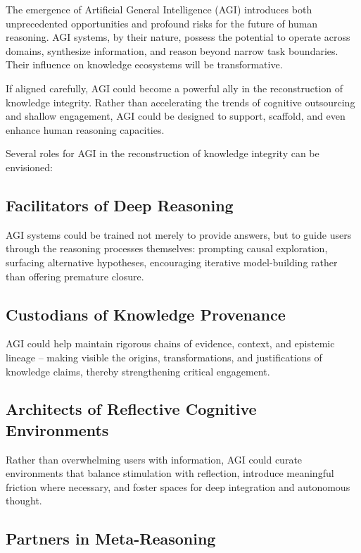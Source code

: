 The emergence of Artificial General Intelligence (AGI) introduces both
unprecedented opportunities and profound risks for the future of human
reasoning. AGI systems, by their nature, possess the potential to
operate across domains, synthesize information, and reason beyond narrow
task boundaries. Their influence on knowledge ecosystems will be
transformative.

If aligned carefully, AGI could become a powerful ally in the
reconstruction of knowledge integrity. Rather than accelerating the
trends of cognitive outsourcing and shallow engagement, AGI could be
designed to support, scaffold, and even enhance human reasoning
capacities.

Several roles for AGI in the reconstruction of knowledge integrity can
be envisioned:

\subsection{Facilitators of Deep Reasoning}

AGI systems could be trained not merely to provide answers, but to guide
users through the reasoning processes themselves: prompting causal
exploration, surfacing alternative hypotheses, encouraging iterative
model-building rather than offering premature closure.

\subsection{Custodians of Knowledge Provenance}

AGI could help maintain rigorous chains of evidence, context, and
epistemic lineage -- making visible the origins, transformations, and
justifications of knowledge claims, thereby strengthening critical
engagement.

\subsection{Architects of Reflective Cognitive Environments}

Rather than overwhelming users with information, AGI could curate
environments that balance stimulation with reflection, introduce
meaningful friction where necessary, and foster spaces for deep
integration and autonomous thought.

\subsection{Partners in Meta-Reasoning}

